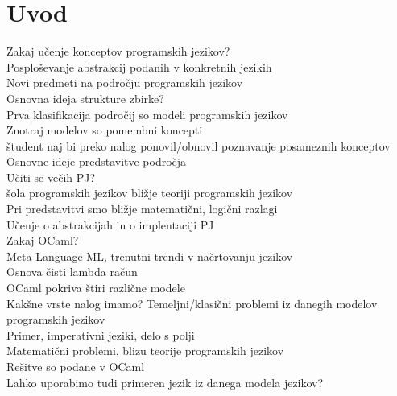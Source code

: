 \chapter{Uvod}

\noindent
Zakaj u\v cenje konceptov programskih jezikov? \\
Posplo\v sevanje abstrakcij podanih v konkretnih jezikih \\
Novi predmeti na podro\v cju programskih jezikov \\

\noindent
Osnovna ideja strukture zbirke? \\
Prva klasifikacija podro\v cij so modeli programskih jezikov \\
Znotraj modelov so pomembni koncepti \\
\v student naj bi preko nalog ponovil/obnovil poznavanje posameznih konceptov \\

\noindent
Osnovne ideje predstavitve podro\v cja \\
U\v citi se ve\v cih PJ? \\
\v sola programskih jezikov bli\v zje teoriji programskih jezikov \\
Pri predstavitvi smo bli\v zje matemati\v cni, logi\v cni razlagi \\
U\v cenje o abstrakcijah in o implentaciji PJ \\

\noindent
Zakaj OCaml? \\
Meta Language ML, trenutni trendi v na\v crtovanju jezikov \\ 
Osnova \v cisti lambda ra\v cun \\
OCaml pokriva \v stiri razli\v cne modele \\

\noindent
Kak\v sne vrste nalog imamo?
Temeljni/klasi\v cni problemi iz danegih modelov programskih jezikov \\
Primer, imperativni jeziki, delo s polji \\
Matemati\v cni problemi, blizu teorije programskih jezikov \\

\noindent
Re\v sitve so podane v OCaml \\
Lahko uporabimo tudi primeren jezik iz danega modela jezikov? \\



